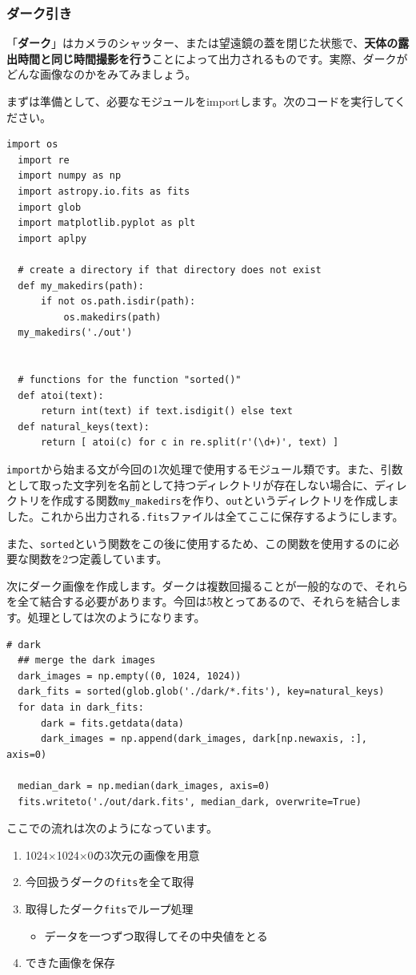 \subsubsection{ダーク引き}
「\textbf{ダーク}」はカメラのシャッター、または望遠鏡の蓋を閉じた状態で、\textbf{天体の露出時間と同じ時間撮影を行う}ことによって出力されるものです。実際、ダークがどんな画像なのかをみてみましょう。\par
まずは準備として、必要なモジュールをimportします。次のコードを実行してください。
\begin{lstlisting}[caption=モジュールのimport, label=code:import]
  import os
  import re
  import numpy as np
  import astropy.io.fits as fits
  import glob
  import matplotlib.pyplot as plt
  import aplpy

  # create a directory if that directory does not exist
  def my_makedirs(path):
      if not os.path.isdir(path):
          os.makedirs(path)
  my_makedirs('./out')


  # functions for the function "sorted()"
  def atoi(text):
      return int(text) if text.isdigit() else text
  def natural_keys(text):
      return [ atoi(c) for c in re.split(r'(\d+)', text) ]
\end{lstlisting}
\texttt{import}から始まる文が今回の1次処理で使用するモジュール類です。また、引数として取った文字列を名前として持つディレクトリが存在しない場合に、ディレクトリを作成する関数\texttt{my\_makedirs}を作り、\texttt{out}というディレクトリを作成しました。これから出力される\texttt{.fits}ファイルは全てここに保存するようにします。\par
また、\texttt{sorted}という関数をこの後に使用するため、この関数を使用するのに必要な関数を2つ定義しています。\par
次にダーク画像を作成します。ダークは複数回撮ることが一般的なので、それらを全て結合する必要があります。今回は5枚とってあるので、それらを結合します。処理としては次のようになります。
\begin{lstlisting}[caption=ダーク画像の作成, label=code:mk_dark]
  # dark
  ## merge the dark images
  dark_images = np.empty((0, 1024, 1024))
  dark_fits = sorted(glob.glob('./dark/*.fits'), key=natural_keys)
  for data in dark_fits:
      dark = fits.getdata(data)
      dark_images = np.append(dark_images, dark[np.newaxis, :], axis=0)

  median_dark = np.median(dark_images, axis=0)
  fits.writeto('./out/dark.fits', median_dark, overwrite=True)
\end{lstlisting}
ここでの流れは次のようになっています。
\begin{enumerate}[(1)]
  \item 1024$\times$1024$\times$0の3次元の画像を用意
  \item 今回扱うダークの\texttt{fits}を全て取得
  \item 取得したダーク\texttt{fits}でループ処理
  \begin{itemize}
    \item データを一つずつ取得してその中央値をとる
  \end{itemize}
  \item できた画像を保存
\end{enumerate}

